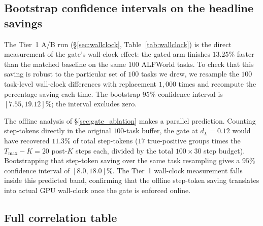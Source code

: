 \documentclass{article}
\begin{document}
\subsection{Bootstrap confidence intervals on the headline savings}
\label{app:bootstrap_ci}

The Tier~1 A/B run (\S\ref{sec:wallclock}, Table~\ref{tab:wallclock})
is the direct measurement of the gate's wall-clock effect: the
gated arm finishes $13.25\%$ faster than the matched baseline on
the same $100$ ALFWorld tasks. To check that this saving is
robust to the particular set of $100$ tasks we drew, we resample
the $100$ task-level wall-clock differences with replacement
$1{,}000$ times and recompute the percentage saving each time.
The bootstrap $95\%$ confidence interval is $[7.55, 19.12]\%$;
the interval excludes zero.

The offline analysis of \S\ref{sec:gate_ablation} makes a
parallel prediction. Counting step-tokens directly in the
original $100$-task buffer, the gate at $d_L\!=\!0.12$ would have
recovered $11.3\%$ of total step-tokens ($17$ true-positive
groups times the $T_{\max}\!-\!K\!=\!20$ post-$K$ steps each,
divided by the total $100\!\times\!30$ step budget).
Bootstrapping that step-token saving over the same task
resampling gives a $95\%$ confidence interval of $[8.0, 18.0]\%$.
The Tier~1 wall-clock measurement falls inside this predicted
band, confirming that the offline step-token saving translates
into actual GPU wall-clock once the gate is enforced online.

\subsection{Full correlation table}
\label{app:full_correlation}
\end{document}
